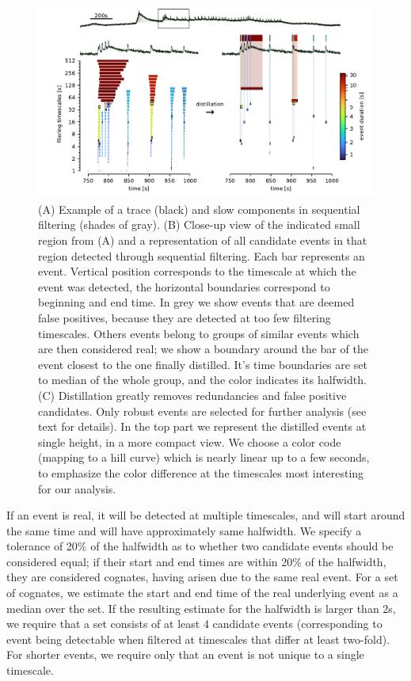 \documentclass[a4paper,11pt,oneside,]{article}
\begin{document}
\begin{figure}[t]

 \centering
 \includegraphics[trim=12mm 0 0mm 0mm, scale=0.9]{figures/evdist.pdf}
 \caption{(A) Example of a trace (black) and slow components in sequential filtering (shades of gray). %
 (B) Close-up view of the indicated small region from (A) and a representation of all candidate events in that region detected through sequential filtering.
 Each bar represents an event. Vertical position corresponds to the timescale at which the event was detected, the horizontal boundaries correspond to beginning and end time.
 In grey we show events that are deemed false positives, because they are detected at too few filtering timescales.
 Others events belong to groups of similar events which are then considered real; we show a boundary around the bar of the event closest to the one finally distilled. 
 It's time boundaries are set to median of the whole group, and the color indicates its halfwidth.
 (C) Distillation greatly removes redundancies and false positive candidates. Only robust events are selected for further analysis (see text for details). 
 In the top part we represent the distilled events at single height, in a more compact view.
 We choose a color code (mapping to a hill curve) which is nearly linear up to a few seconds, to emphasize the color difference at the timescales most interesting for our analysis.
 }
 \label{fig:evdist_demo}
\end{figure}



If an event is real, it will be detected at multiple timescales, and will start around the same time and will have approximately same halfwidth.
We specify a tolerance of 20\% of the halfwidth as to whether two candidate events should be considered equal; if their start and end times are within 20\% of the halfwidth, they are considered cognates, having arisen due to the same real event. 
For a set of cognates, we estimate the start and end time of the real underlying event as a median over the set.
If the resulting estimate for the halfwidth is larger than 2s, we require that a set consists of at least 4 candidate events (corresponding to event being detectable when filtered at timescales that differ at least two-fold).
For shorter events, we require only that an event is not unique to a single timescale.
\end{document}
